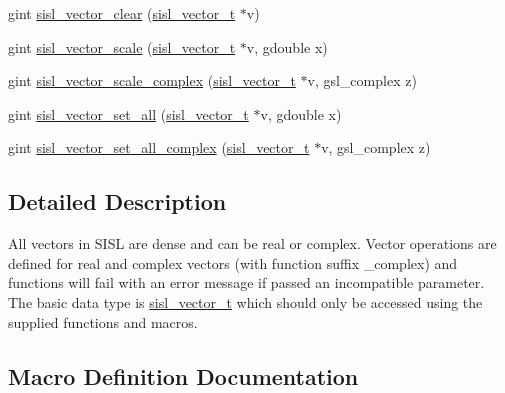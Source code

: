 \begin{DoxyCompactItemize}
\item 
gint \mbox{\hyperlink{group__vector_gac61e04a39ddbc2f6c14ebba09787e7b3}{sisl\+\_\+vector\+\_\+clear}} (\mbox{\hyperlink{group__vector_gacbac585492f5005f05f0c0b8463039be}{sisl\+\_\+vector\+\_\+t}} $\ast$v)
\item 
gint \mbox{\hyperlink{group__vector_gae10dd87e1006defb6e54392f8ef9e1e5}{sisl\+\_\+vector\+\_\+scale}} (\mbox{\hyperlink{group__vector_gacbac585492f5005f05f0c0b8463039be}{sisl\+\_\+vector\+\_\+t}} $\ast$v, gdouble x)
\item 
gint \mbox{\hyperlink{group__vector_ga57a386cd94671f45ee0ad4d2d0f6b863}{sisl\+\_\+vector\+\_\+scale\+\_\+complex}} (\mbox{\hyperlink{group__vector_gacbac585492f5005f05f0c0b8463039be}{sisl\+\_\+vector\+\_\+t}} $\ast$v, gsl\+\_\+complex z)
\item 
gint \mbox{\hyperlink{group__vector_ga4c687e753645759cf09ed9c8b63ae49b}{sisl\+\_\+vector\+\_\+set\+\_\+all}} (\mbox{\hyperlink{group__vector_gacbac585492f5005f05f0c0b8463039be}{sisl\+\_\+vector\+\_\+t}} $\ast$v, gdouble x)
\item 
gint \mbox{\hyperlink{group__vector_ga033227a0e85218e8bda5aeacf7ec539e}{sisl\+\_\+vector\+\_\+set\+\_\+all\+\_\+complex}} (\mbox{\hyperlink{group__vector_gacbac585492f5005f05f0c0b8463039be}{sisl\+\_\+vector\+\_\+t}} $\ast$v, gsl\+\_\+complex z)
\end{DoxyCompactItemize}


\subsection{Detailed Description}
All vectors in S\+I\+SL are dense and can be real or complex. Vector operations are defined for real and complex vectors (with function suffix \+\_\+complex) and functions will fail with an error message if passed an incompatible parameter. The basic data type is \mbox{\hyperlink{group__vector_gacbac585492f5005f05f0c0b8463039be}{sisl\+\_\+vector\+\_\+t}} which should only be accessed using the supplied functions and macros. 

\subsection{Macro Definition Documentation}
\mbox{\label{group__vector_ga641f9422ee1306fd75a9a631ee3a11b3}} 
